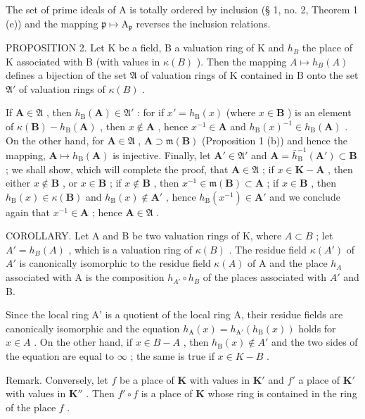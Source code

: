 The set of prime ideals of A is totally ordered by inclusion (§ 1, no. 2, Theorem 1 (e)) and the mapping \(\mathfrak{p} \mapsto \mathrm{A}_{\mathfrak{p}}\) reverses the inclusion relations.

PROPOSITION 2. Let K be a field, B a valuation ring of K and \(h_B\) the place of K associated with B (with values in \(\kappa(B)\) ). Then the mapping \(A \mapsto h_B(A)\) defines a bijection of the set \(\mathfrak{A}\) of valuation rings of K contained in B onto the set \(\mathfrak{A}'\) of valuation rings of \(\kappa(B)\) .

If \(\mathbf{A} \in \mathfrak{A}\) , then \(h_{\mathrm{B}}(\mathbf{A}) \in \mathfrak{A}'\) : for if \(x' = h_{\mathrm{B}}(x)\) (where \(x \in \mathbf{B}\) ) is an element of \(\kappa(\mathbf{B}) - h_{\mathrm{B}}(\mathbf{A})\) , then \(x \notin \mathbf{A}\) , hence \(x^{-1} \in \mathbf{A}\) and \(h_{\mathrm{B}}(x)^{-1} \in h_{\mathrm{B}}(\mathbf{A})\) . On the other hand, for \(\mathbf{A} \in \mathfrak{A}\) , \(\mathbf{A} \supset \mathfrak{m}(\mathbf{B})\) (Proposition 1 (b)) and hence the mapping, \(\mathbf{A} \mapsto h_{\mathrm{B}}(\mathbf{A})\) is injective. Finally, let \(\mathbf{A}' \in \mathfrak{A}'\) and \(\mathbf{A} = \bar{h}_{\mathrm{B}}^{-1}(\mathbf{A}') \subset \mathbf{B}\) ; we shall show, which will complete the proof, that \(\mathbf{A} \in \mathfrak{A}\) ; if \(x \in \mathbf{K} - \mathbf{A}\) , then either \(x \notin \mathbf{B}\) , or \(x \in \mathbf{B}\) ; if \(x \notin \mathbf{B}\) , then \(x^{-1} \in \mathfrak{m}(\mathbf{B}) \subset \mathbf{A}\) ; if \(x \in \mathbf{B}\) , then \(h_{\mathrm{B}}(x) \in \kappa(\mathbf{B})\) and \(h_{\mathrm{B}}(x) \notin \mathbf{A}'\) , hence \(h_{\mathrm{B}}(x^{-1}) \in \mathbf{A}'\) and we conclude again that \(x^{-1} \in \mathbf{A}\) ; hence \(\mathbf{A} \in \mathfrak{A}\) .

COROLLARY. Let A and B be two valuation rings of K, where \(A \subset B\) ; let \(A' = h_{B}(A)\) , which is a valuation ring of \(\kappa(B)\) . The residue field \(\kappa(A')\) of \(A'\) is canonically isomorphic to the residue field \(\kappa(A)\) of A and the place \(h_{A}\) associated with A is the composition \(h_{A'} \circ h_{B}\) of the places associated with \(A'\) and B.

Since the local ring A' is a quotient of the local ring A, their residue fields are canonically isomorphic and the equation \(h_{\mathrm{A}}(x) = h_{\mathrm{A}'}(h_{\mathrm{B}}(x))\) holds for \(x \in A\) . On the other hand, if \(x \in B - A\) , then \(h_{\mathrm{B}}(x) \notin A'\) and the two sides of the equation are equal to \(\infty\) ; the same is true if \(x \in K - B\) .

Remark. Conversely, let \(f\) be a place of \(\mathbf{K}\) with values in \(\mathbf{K}'\) and \(f'\) a place of \(\mathbf{K}'\) with values in \(\mathbf{K}''\) . Then \(f' \circ f\) is a place of \(\mathbf{K}\) whose ring is contained in the ring of the place \(f\) .

